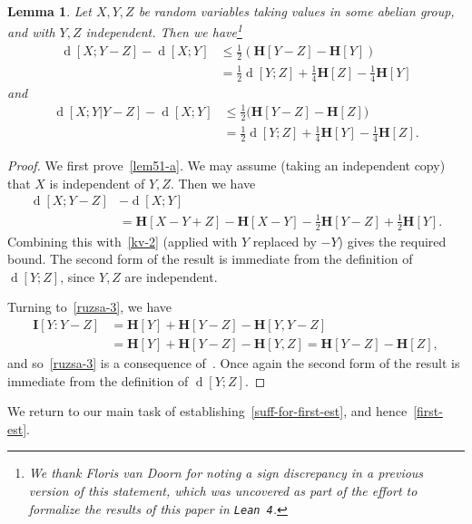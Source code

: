 \documentclass[12pt,reqno,tbtags]{amsart}
\newtheorem{lemma}[theorem]{Lemma}
\theoremstyle{definition}
\theoremstyle{remark}
\renewcommand{\leq}{\leqslant}
\newcommand{\ent}[1]{\mathbf{H}[#1]}
\newcommand{\I}[1]{\mathbf{I}[#1]}
\newcommand{\dist}[2]{{\operatorname{d}[#1;#2]}} %
\numberwithin{equation}{section}
\begin{document}
\begin{lemma}\label{first-useful}
  Let $X, Y, Z$ be random variables taking values in some abelian group, and with $Y, Z$ independent. Then we have\footnote{We thank Floris van Doorn for noting a sign discrepancy in a previous version of this statement, which was uncovered as part of the effort to formalize the results of this paper in {\tt Lean 4}.}
\begin{align}\nonumber \dist{X}{Y - Z} - \dist{X}{Y} &  \leq \tfrac{1}{2} (\ent{Y-Z} - \ent{Y}) \\ & = \tfrac{1}{2} \dist{Y}{Z} + \tfrac{1}{4} \ent{Z} - \tfrac{1}{4} \ent{Y} \label{lem51-a} \end{align}
and
\begin{align}\nonumber
\dist{X}{Y|Y-Z} - \dist{X}{Y} & \leq \tfrac{1}{2} \bigl(\ent{Y-Z} - \ent{Z}\bigr) \\ & = \tfrac{1}{2} \dist{Y}{Z} + \tfrac{1}{4} \ent{Y} - \tfrac{1}{4} \ent{Z}.
  \label{ruzsa-3}
\end{align}
\end{lemma}
\begin{proof}
We first prove~\eqref{lem51-a}. We may assume (taking an independent copy) that $X$ is independent of $Y, Z$. Then we have
\begin{align*}  \dist{X}{Y-Z} & - \dist{X}{Y} \\ & = \ent{X - Y + Z} - \ent{X-Y} - \tfrac{1}{2}\ent{Y - Z} + \tfrac{1}{2} \ent{Y}.\end{align*}
Combining this with~\eqref{kv-2} (applied with $Y$ replaced by $-Y$) gives the required bound. The second form of the result is immediate from the definition of $\dist{Y}{Z}$, since $Y, Z$ are independent.


Turning to~\eqref{ruzsa-3}, we have
\begin{align*} \I{Y : Y-Z} & = \ent{Y} + \ent{Y - Z} - \ent{Y, Y - Z} \\ & = \ent{Y} + \ent{Y - Z} - \ent{Y, Z}  = \ent{Y - Z} - \ent{Z},\end{align*}
and so~\eqref{ruzsa-3} is a consequence of~.
Once again the second form of the result is immediate from the definition of $\dist{Y}{Z}$.
\end{proof}

We return to our main task of establishing~\eqref{suff-for-first-est}, and hence~\eqref{first-est}.
\end{document}
